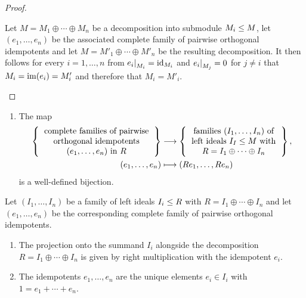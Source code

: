 \begin{proof}
\begin{enumerate}
      Let $M = M_1 \oplus \dotsb \oplus M_n$ be a decomposition into submodule $M_i \leq M$, let $(e_1, \dotsc, e_n)$ be the associated complete family of pairwise orthogonal idempotents and let $M = M'_1 \oplus \dotsb \oplus M'_n$ be the resulting decomposition.
      It then follows for every $i = 1, \dotsc, n$ from $\restrict{e_i}{M_i} = \id_{M_i}$ and $\restrict{e_i}{M_j} = 0$ for $j \neq i$ that $M_i = \operatorname{im}(e_i) = M_i'$ and therefore that $M_i = M'_i$.
    \qedhere
  \end{enumerate}
\end{proof}


\begin{corollary}
  \label{corollary: correspondence idempotents and direct ideal decompositions}
  \leavevmode
  \begin{enumerate}
    \item
    \label{enumerate: idempotent ring elements and decompositions}
    The map
    \begin{align*}
      \left\{
        \begin{tabular}{c}
          complete families of pairwise \\
          orthogonal idempotents  \\
          $(e_1, \dotsc, e_n)$ in $R$
        \end{tabular}
      \right\}
      &\longto
        \left\{
        \begin{tabular}{c}
          families $(I_1, \dotsc, I_n)$ of    \\
          left ideals $I_I \moduleleq M$ with \\
          $R = I_1 \oplus \dotsb \oplus I_n$
        \end{tabular}
        \right\},
      \\
                    (e_1, \dotsc, e_n)
      &\longmapsto  (Re_1, \dotsc, Re_n)
    \end{align*}
    is a well-defined bijection.
  \end{enumerate}
  Let $(I_1, \dotsc, I_n)$ be a family of left ideals $I_i \leq R$ with $R = I_1 \oplus \dotsb \oplus I_n$ and let $(e_1, \dotsc, e_n)$ be the corresponding complete family of pairwise orthogonal idempotents.
  \begin{enumerate}[resume]
    \item
      \label{enumerate: idempotents are projections}
      The projection onto the summand $I_i$ alongside the decomposition $R = I_1 \oplus \dotsb \oplus I_n$ is given by right multiplication with the idempotent $e_i$.
    \item 
      \label{enumerate: idempotents are summands of 1}
      The idempotents $e_1, \dotsc, e_n$ are the unique elements $e_i \in I_i$ with $1 = e_1 + \dotsb + e_n$.
  \end{enumerate}
\end{corollary}


